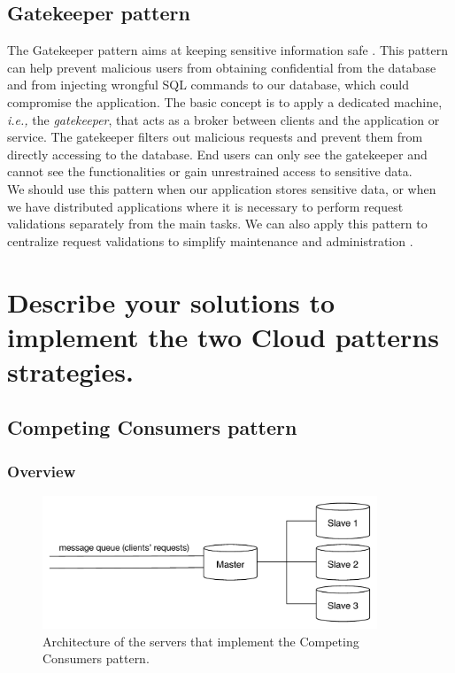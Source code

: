 \documentclass{article}
\begin{document}
\subsection{Gatekeeper pattern}
The Gatekeeper pattern aims at keeping sensitive information safe \cite{gk_microsoft}. This pattern can help prevent malicious users from obtaining confidential from the database and from injecting wrongful SQL commands to our database, which could compromise the application. The basic concept is to apply a dedicated machine, \emph{i.e.,} the \emph{gatekeeper}, that acts as a broker between clients and the application or service. The gatekeeper filters out malicious requests and prevent them from directly accessing to the database. End users can only see the gatekeeper and cannot see the functionalities or gain unrestrained access to sensitive data. \\

We should use this pattern when our application stores sensitive data,
or when we have distributed applications where it is necessary to perform request validations separately from the main tasks. We can also apply this pattern to centralize request validations to simplify maintenance and administration \cite{gk_microsoft}.


\section{Describe your solutions to implement the two Cloud patterns strategies.}\label{Q3}
\subsection{Competing Consumers pattern}
\subsubsection{Overview}

\begin{figure}[t]
    \centering
        \includegraphics[width = 10cm]{images/CCP.pdf}
    \caption{Architecture of the servers that implement the Competing Consumers pattern.}
    \label{fig:arch1}
\end{figure}
\end{document}
